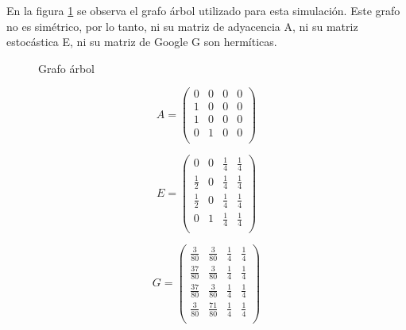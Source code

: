 En la figura \ref{fig:tree} se observa el grafo árbol utilizado para esta simulación. Este grafo no es simétrico, por lo tanto, ni su matriz de adyacencia A, ni su matriz estocástica E, ni su matriz de Google G son hermíticas.

\begin{figure}[H]
    \centering
    \caption[Grafo árbol]{Grafo árbol}
    \label{fig:tree}
\end{figure}

\begin{equation}
    A = 
    \begin{pmatrix}
        0 & 0 & 0 & 0 \\
        1 & 0 & 0 & 0 \\
        1 & 0 & 0 & 0 \\
        0 & 1 & 0 & 0 \\
    \end{pmatrix}
\end{equation}

\begin{equation}
    E =
    \begin{pmatrix}
        0 & 0 & \frac{1}{4} & \frac{1}{4} \\
        \frac{1}{2} & 0 & \frac{1}{4} & \frac{1}{4} \\
        \frac{1}{2} & 0 & \frac{1}{4} & \frac{1}{4} \\
        0 & 1 & \frac{1}{4} & \frac{1}{4} \\
    \end{pmatrix}
\end{equation}

\begin{equation}
    G =
    \begin{pmatrix}
        \frac{3}{80} & \frac{3}{80} & \frac{1}{4} & \frac{1}{4} \\
        \frac{37}{80} & \frac{3}{80} & \frac{1}{4} & \frac{1}{4} \\
        \frac{37}{80} & \frac{3}{80} & \frac{1}{4} & \frac{1}{4} \\
        \frac{3}{80} & \frac{71}{80} & \frac{1}{4} & \frac{1}{4} \\
    \end{pmatrix}
\end{equation}

